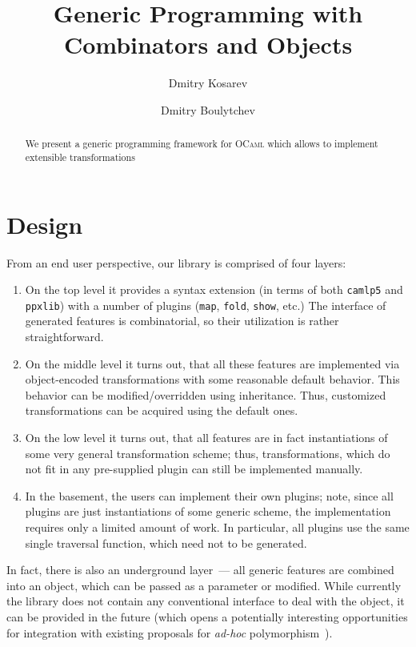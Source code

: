 \documentclass[submission,copyright,creativecommons]{eptcs}
\title{Generic Programming with Combinators and Objects}
\author{Dmitry Kosarev
  \institute{St. Petersburg State University\\
    JetBrains Research \\
    St. Petersburg, Russia}
\email{Dmitrii.Kosarev@protonmail.ch}
\and
Dmitry Boulytchev
\institute{St. Petersburg State University\\
  JetBrains Research \\
  St. Petersburg, Russia}
\email{dboulytchev@math.spbu.ru}
}
\newcommand{\cd}[1]{\texttt{#1}}
\begin{document}
\maketitle

\begin{abstract}
  We present a generic programming framework for \textsc{OCaml} which allows to implement extensible
  transformations 
\end{abstract}




\section{Design}


From an end user perspective, our library is comprised of four layers:

\begin{enumerate}
\item On the top level it provides a syntax extension (in terms of both \cd{camlp5} and \cd{ppxlib}) with a number of plugins
(\cd{map}, \cd{fold}, \cd{show}, etc.) The interface of generated features is combinatorial, so their utilization is rather straightforward.
  
\item On the middle level it turns out, that all these features are implemented via object-encoded transformations with some reasonable
default behavior. This behavior can be modified/overridden using inheritance. Thus, customized transformations can be acquired using
the default ones.

\item On the low level it turns out, that all features are in fact instantiations of some very general transformation scheme; thus, transformations,
which do not fit in any pre-supplied plugin can still be implemented manually.
  
\item In the basement, the users can implement their own plugins; note, since all plugins are just instantiations of some generic scheme, the implementation
requires only a limited amount of work. In particular, all plugins use the same single traversal function, which need not to be generated.
\end{enumerate}

In fact, there is also an underground layer~--- all generic features are combined into an object, which can be passed as a parameter or modified. While
currently the library does not contain any conventional interface to deal with the object, it can be provided in the future (which opens a potentially
interesting opportunities for integration with existing proposals for \emph{ad-hoc} polymorphism~\cite{ModularImplicits}).
\end{document}

